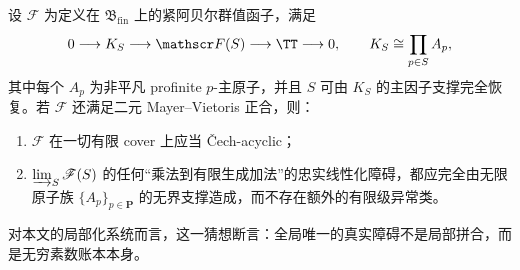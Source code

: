 \begin{conjecture}\label{conj:conclusion-localized-finite-descent-infinite-support-dichotomy}
设 \(\mathscr F\) 为定义在 \(\mathfrak B_{\mathrm{fin}}\) 上的紧阿贝尔群值函子，满足
\[
0\longrightarrow K_S\longrightarrow \mathscr F(S)\longrightarrow \TT\longrightarrow 0,
\qquad
K_S\cong \prod_{p\in S} A_p,
\]
其中每个 \(A_p\) 为非平凡 profinite \(p\)-主原子，并且 \(S\) 可由 \(K_S\) 的主因子支撑完全恢复。若 \(\mathscr F\) 还满足二元 Mayer--Vietoris 正合，则：
\begin{enumerate}
  \item \(\mathscr F\) 在一切有限 cover 上应当 \v Cech-acyclic；
  \item \(\varinjlim_S \mathscr F(S)\) 的任何“乘法到有限生成加法”的忠实线性化障碍，都应完全由无限原子族 \(\{A_p\}_{p\in\mathbf P}\) 的无界支撑造成，而不存在额外的有限级异常类。
\end{enumerate}
对本文的局部化系统而言，这一猜想断言：全局唯一的真实障碍不是局部拼合，而是无穷素数账本本身。
\end{conjecture}

\endinput
